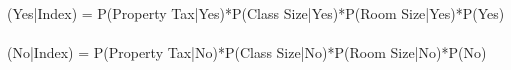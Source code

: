 \\
(Yes|Index) = P(Property Tax|Yes)*P(Class Size|Yes)*P(Room Size|Yes)*P(Yes)
\\\\
(No|Index) = P(Property Tax|No)*P(Class Size|No)*P(Room Size|No)*P(No)

